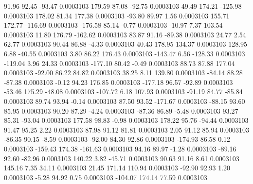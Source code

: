        91.96       92.45      -93.47     0.0003103
      179.59       87.08      -92.75     0.0003103
       49.49      174.21     -125.98     0.0003103
      178.02       81.34      177.38     0.0003103
      -93.80       89.97        1.56     0.0003103
      155.71      172.77     -116.69     0.0003103
     -176.58       85.14       -0.77     0.0003103
      -10.97        7.37      103.54     0.0003103
       11.80      176.79     -162.62     0.0003103
       83.87       91.16      -89.38     0.0003103
       24.77        2.54       62.77     0.0003103
       90.44       86.88       -4.33     0.0003103
       40.43      178.95      134.37     0.0003103
      128.95        6.88      -40.55     0.0003103
        3.80       86.22      176.43     0.0003103
     -143.47        6.56     -128.33     0.0003103
     -119.04        3.96       24.33     0.0003103
     -177.10       80.42       -0.49     0.0003103
       88.73       87.88      177.04     0.0003103
      -92.00       86.22       84.82     0.0003103
       38.25        8.11      139.80     0.0003103
      -84.14       88.28      -87.38     0.0003103
       -0.12       94.23      176.85     0.0003103
     -177.18       96.57      -92.89     0.0003103
      -53.46      175.29      -48.08     0.0003103
     -107.72        6.18      107.93     0.0003103
      -91.19       84.77      -85.84     0.0003103
       89.74       93.94       -0.14     0.0003103
       87.50       93.52     -171.67     0.0003103
      -88.15       93.60       85.95     0.0003103
       90.20       87.29       -4.24     0.0003103
      -87.36       86.89       -5.48     0.0003103
       93.27       85.31      -93.04     0.0003103
      177.58       98.83       -0.98     0.0003103
      178.22       95.76      -94.44     0.0003103
       91.47       95.25        2.22     0.0003103
       87.98       91.12       81.81     0.0003103
        2.05       91.12       85.94     0.0003103
      -86.35       90.15       -8.59     0.0003103
      -92.00       84.30       92.86     0.0003103
     -174.93       86.58        0.12     0.0003103
     -159.43      174.38     -161.63     0.0003103
       94.16       89.97       -1.28     0.0003103
      -89.16       92.60      -82.96     0.0003103
      140.22        3.82      -45.71     0.0003103
       90.63       91.16        8.61     0.0003103
      145.16        7.35       34.11     0.0003103
       21.45      171.14      110.94     0.0003103
      -92.90       92.93        1.20     0.0003103
       -5.28       94.92        0.75     0.0003103
     -104.07      174.14       77.59     0.0003103
